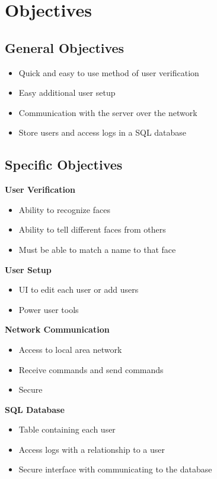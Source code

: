 \documentclass[12pt,a4paper]{report}
\begin{document}
\section{Objectives}\label{section:_Toc370402507}
\subsection{General Objectives}\label{section:_Toc370402508}
\begin{itemize}
\item Quick and easy to use method of user verification
\item Easy additional user setup
\item Communication with the server over the network
\item Store users and access logs in a SQL database
\end{itemize}
\subsection{Specific Objectives}\label{section:_Toc370402509}
\textbf{User Verification}

\begin{itemize}
\item Ability to recognize faces
\item Ability to tell different faces from others
\item Must be able to match a name to that face
\end{itemize}
\textbf{User Setup}

\begin{itemize}
\item UI to edit each user or add users
\item Power user tools
\end{itemize}
\textbf{Network Communication}

\begin{itemize}
\item Access to local area network
\item Receive commands and send commands
\item Secure
\end{itemize}
\textbf{SQL Database}

\begin{itemize}
\item Table containing each user
\item Access logs with a relationship to a user
\item Secure interface with communicating to the database
\end{itemize}
\end{document}
